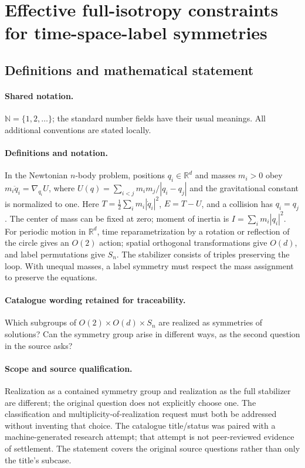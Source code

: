 \documentclass[11pt]{article}
\begin{document}
\section{Effective full-isotropy constraints for time-space-label symmetries}\label{statement}

\subsection{Definitions and mathematical statement}

\paragraph{Shared notation.}$\mathbb N=\{1,2,\ldots\}$; the standard number fields have their usual meanings. All additional conventions are stated locally.


\paragraph{Definitions and notation.}In the Newtonian $n$-body problem, positions $q_i\in\mathbb R^d$ and masses $m_i>0$ obey $m_i\ddot q_i=\nabla_{q_i}U$, where $U(q)=\sum_{i<j}m_im_j/|q_i-q_j|$ and the gravitational constant is normalized to one. Here $T=\tfrac12\sum_i m_i|\dot q_i|^2$, $E=T-U$, and a collision has $q_i=q_j$. The center of mass can be fixed at zero; moment of inertia is $I=\sum_i m_i|q_i|^2$. For periodic motion in $\mathbb R^d$, time reparametrization by a rotation or reflection of the circle gives an $O(2)$ action; spatial orthogonal transformations give $O(d)$, and label permutations give $S_n$. The stabilizer consists of triples preserving the loop. With unequal masses, a label symmetry must respect the mass assignment to preserve the equations.

\paragraph{Catalogue wording retained for traceability.}
Which subgroups of $O(2)\times O(d)\times S_n$ are realized as symmetries of solutions? Can the symmetry group arise in different ways, as the second question in the source asks?
\paragraph{Scope and source qualification.}Realization as a contained symmetry group and realization as the full stabilizer are different; the original question does not explicitly choose one. The classification and multiplicity-of-realization request must both be addressed without inventing that choice. The catalogue title/status was paired with a machine-generated research attempt; that attempt is not peer-reviewed evidence of settlement. The statement covers the original source questions rather than only the title’s subcase.
\end{document}
